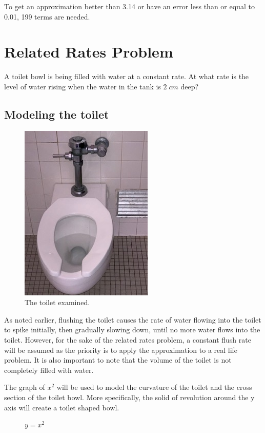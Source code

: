 \documentclass[12pt, titlepage]{article}
\begin{document}
To get an approximation better than 3.14 or have an error less than or equal to 0.01, 199 terms are needed. 

\section{Related Rates Problem}
A toilet bowl is being filled with water at a constant rate. At what rate is the level of water rising when the water in the tank is \(2 \; cm\) deep?

\subsection{Modeling the toilet}
\begin{figure}[H]
\centering
  \includegraphics[angle=270]{toilet.jpeg}
    \caption{The toilet examined.}
\end{figure}

As noted earlier, flushing the toilet causes the rate of water flowing into the toilet to spike initially, then gradually slowing down, until no more water flows into the toilet. However, for the sake of the related rates problem, a constant flush rate will be assumed as the priority is to apply the approximation to a real life problem. It is also important to note that the volume of the toilet is not completely filled with water.  

The graph of \(x^{2}\) will be used to model the curvature of the toilet and the cross section of the toilet bowl. More specifically, the solid of revolution around the y axis will create a toilet shaped bowl. 

\begin{figure}[H]
\centering
    \caption[]{\(y=x^2\)}
\end{figure}
\end{document}
